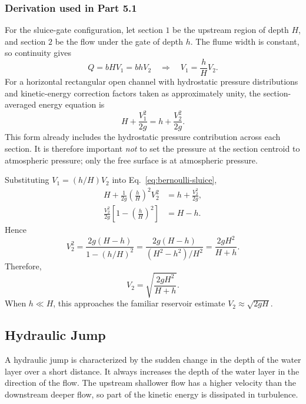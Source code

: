 \documentclass[12pt,letterpaper]{article}
\begin{document}
\subsubsection*{Derivation used in Part 5.1}
For the sluice-gate configuration, let section \(1\) be the upstream region of depth \(H\), and section \(2\) be the flow under the gate of depth \(h\). The flume width is constant, so continuity gives
\begin{equation}
Q = bHV_1 = bhV_2
\quad\Longrightarrow\quad
V_1 = \frac{h}{H}V_2.
\label{eq:continuity-sluice}
\end{equation}
For a horizontal rectangular open channel with hydrostatic pressure distributions and kinetic-energy correction factors taken as approximately unity, the section-averaged energy equation is
\begin{equation}
H + \frac{V_1^2}{2g}
=
h + \frac{V_2^2}{2g}.
\label{eq:bernoulli-sluice}
\end{equation}
This form already includes the hydrostatic pressure contribution across each section. It is therefore important \emph{not} to set the pressure at the section centroid to atmospheric pressure; only the free surface is at atmospheric pressure.

Substituting \(V_1=(h/H)V_2\) into Eq.~\eqref{eq:bernoulli-sluice},
\begin{align}
H + \frac{1}{2g}\left(\frac{h}{H}\right)^2 V_2^2
&=
h + \frac{V_2^2}{2g}, \\
\frac{V_2^2}{2g}\left[1-\left(\frac{h}{H}\right)^2\right]
&=
H-h.
\end{align}
Hence
\begin{equation}
V_2^2
=
\frac{2g(H-h)}{1-(h/H)^2}
=
\frac{2g(H-h)}{(H^2-h^2)/H^2}
=
\frac{2gH^2}{H+h}.
\end{equation}
Therefore,
\begin{equation}
\boxed{V_2 = \sqrt{\frac{2gH^2}{H+h}}}.
\label{eq:sluice-velocity-derived}
\end{equation}
When \(h\ll H\), this approaches the familiar reservoir estimate \(V_2\approx\sqrt{2gH}\).

\subsection{Hydraulic Jump}
A hydraulic jump is characterized by the sudden change in the depth of the water layer over a short distance. It always increases the depth of the water layer in the direction of the flow. The upstream shallower flow has a higher velocity than the downstream deeper flow, so part of the kinetic energy is dissipated in turbulence.
\end{document}
